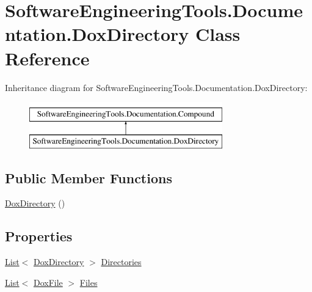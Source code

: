 \hypertarget{class_software_engineering_tools_1_1_documentation_1_1_dox_directory}{\section{Software\+Engineering\+Tools.\+Documentation.\+Dox\+Directory Class Reference}
\label{class_software_engineering_tools_1_1_documentation_1_1_dox_directory}
}
Inheritance diagram for Software\+Engineering\+Tools.\+Documentation.\+Dox\+Directory\+:\begin{figure}[H]
\begin{center}
\leavevmode
\includegraphics[height=2.000000cm]{class_software_engineering_tools_1_1_documentation_1_1_dox_directory}
\end{center}
\end{figure}
\subsection*{Public Member Functions}
\begin{DoxyCompactItemize}
\item 
\hyperlink{class_software_engineering_tools_1_1_documentation_1_1_dox_directory_a57e40f117355844005990389a7adc2f1}{Dox\+Directory} ()
\end{DoxyCompactItemize}
\subsection*{Properties}
\begin{DoxyCompactItemize}
\item 
\hyperlink{namespace_software_engineering_tools_1_1_documentation_ae0bccf4f49a76db084c1c316e5954ec9a4ee29ca12c7d126654bd0e5275de6135}{List}$<$ \hyperlink{class_software_engineering_tools_1_1_documentation_1_1_dox_directory}{Dox\+Directory} $>$ \hyperlink{class_software_engineering_tools_1_1_documentation_1_1_dox_directory_a88bce63c9ba403344a733f67159ff687}{Directories}
\item 
\hyperlink{namespace_software_engineering_tools_1_1_documentation_ae0bccf4f49a76db084c1c316e5954ec9a4ee29ca12c7d126654bd0e5275de6135}{List}$<$ \hyperlink{class_software_engineering_tools_1_1_documentation_1_1_dox_file}{Dox\+File} $>$ \hyperlink{class_software_engineering_tools_1_1_documentation_1_1_dox_directory_aa76527e2b4b70c0badbaa9fbd95a9d11}{Files}
\end{DoxyCompactItemize}


